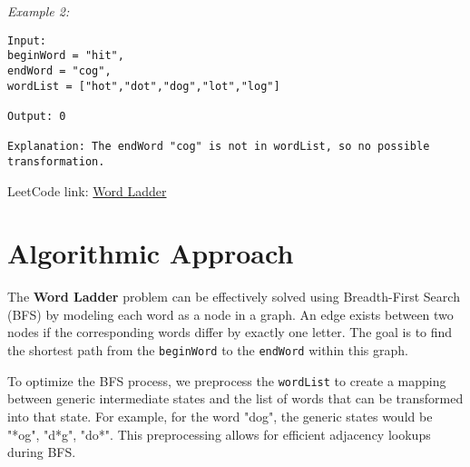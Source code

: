 \textit{Example 2:}

\begin{verbatim}
Input:
beginWord = "hit",
endWord = "cog",
wordList = ["hot","dot","dog","lot","log"]

Output: 0

Explanation: The endWord "cog" is not in wordList, so no possible transformation.
\end{verbatim}

LeetCode link: \href{https://leetcode.com/problems/word-ladder/}{Word Ladder}


\section*{Algorithmic Approach}

The \textbf{Word Ladder} problem can be effectively solved using Breadth-First Search (BFS) by modeling each word as a node in a graph. An edge exists between two nodes if the corresponding words differ by exactly one letter. The goal is to find the shortest path from the \texttt{beginWord} to the \texttt{endWord} within this graph.

To optimize the BFS process, we preprocess the \texttt{wordList} to create a mapping between generic intermediate states and the list of words that can be transformed into that state. For example, for the word "dog", the generic states would be "*og", "d*g", "do*". This preprocessing allows for efficient adjacency lookups during BFS.

